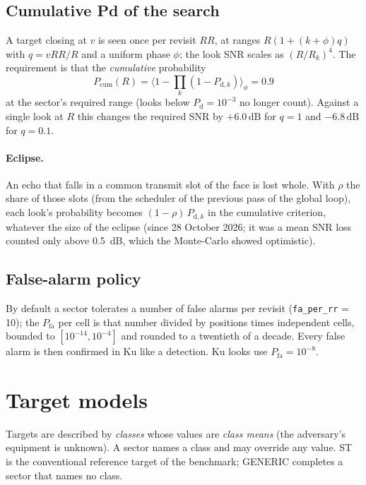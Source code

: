 \documentclass[11pt,a4paper]{article}
\newcommand{\code}[1]{\texttt{\small #1}}
\newcommand{\dB}{\,\mathrm{dB}}
\newcommand{\Pd}{P_{\mathrm d}}
\newcommand{\Pfa}{P_{\mathrm{fa}}}
\begin{document}
\subsection{Cumulative Pd of the search}
A target closing at $v$ is seen once per revisit $RR$, at ranges $R(1+(k+\phi)q)$ with $q = vRR/R$ and a uniform phase
$\phi$; the look SNR scales as $(R/R_k)^4$. The requirement is that the \emph{cumulative} probability
\[
  P_{\mathrm{cum}}(R) = \bigl\langle 1 - \textstyle\prod_k (1 - P_{\mathrm{d},k})\bigr\rangle_\phi = 0.9
\]
at the sector's required range (looks below $\Pd = 10^{-3}$ no longer count). Against a single look at $R$ this changes
the required SNR by $+6.0\dB$ for $q=1$ and $-6.8\dB$ for $q=0.1$.

\paragraph{Eclipse.} An echo that falls in a common transmit slot of the face is lost whole. With $\rho$ the share of
those slots (from the scheduler of the previous pass of the global loop), each look's probability becomes
$(1-\rho)\,P_{\mathrm{d},k}$ in the cumulative criterion, whatever the size of the eclipse (since 28 October 2026; it
was a mean SNR loss counted only above \SI{0.5}{dB}, which the Monte-Carlo showed optimistic).

\subsection{False-alarm policy}
By default a sector tolerates a number of false alarms per revisit (\code{fa\_per\_rr} = 10); the $\Pfa$ per cell is
that number divided by positions times independent cells, bounded to $[10^{-14}, 10^{-4}]$ and rounded to a twentieth
of a decade. Every false alarm is then confirmed in Ku like a detection. Ku looks use $\Pfa = 10^{-8}$.

\section{Target models}\label{sec:targets}
Targets are described by \emph{classes} whose values are \emph{class means} (the adversary's equipment is unknown). A sector names a class and may
override any value. ST is the conventional reference target of the benchmark; GENERIC completes a sector that names no
class.
\end{document}
